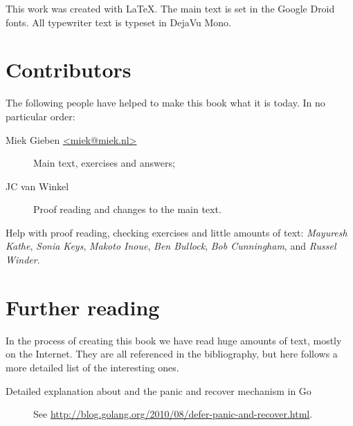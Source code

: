 \noindent{}This work was created with \LaTeX. The main text is set in
the Google Droid fonts. All typewriter text is typeset in DejaVu Mono.

\section{Contributors}
The following people have helped to make this book what it is today.
In no particular order:
\begin{description}
\item[Miek Gieben \qquad\url{<miek@miek.nl>}] 
{Main text, exercises and answers;}
\item[JC van Winkel]
{Proof reading and changes to the main text.}
\end{description}

Help with proof reading, checking exercises and little amounts of text:
\emph{Mayuresh Kathe},
\emph{Sonia Keys},
\emph{Makoto Inoue},
\emph{Ben Bullock},
\emph{Bob Cunningham},
and \emph{Russel Winder}.

\section{Further reading}
In the process of creating this book we have read huge amounts of text,
mostly on the Internet. They are all referenced in the bibliography, but
here follows a more detailed list of the interesting ones.
\begin{description}
\item[Detailed explanation about  and the panic and recover
mechanism in Go]{See 
\url{http://blog.golang.org/2010/08/defer-panic-and-recover.html}.}
\end{description}

